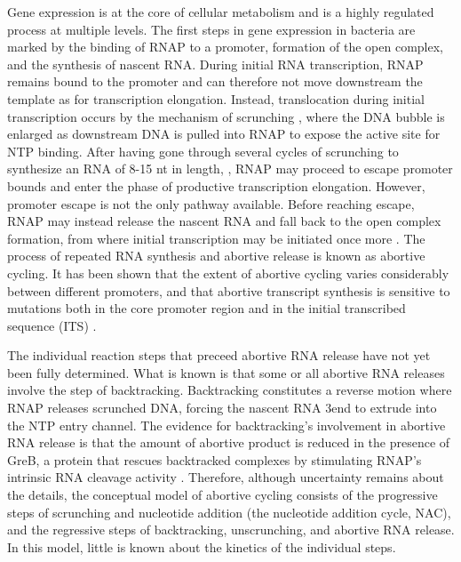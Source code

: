 %
Gene expression is at the core of cellular metabolism and is a highly regulated
process at multiple levels. The first steps in gene expression in bacteria are
marked by the binding of RNAP to a promoter, formation of the open complex,
and the synthesis of nascent RNA. During initial RNA transcription, RNAP
remains bound to the promoter and can therefore not move downstream the template as
for transcription elongation. Instead, translocation during
initial transcription occurs by the mechanism of scrunching
\cite{revyakin_abortive_2006, kapanidis_initial_2006}, where the DNA bubble is
enlarged as downstream DNA is pulled into RNAP to expose the active site for
NTP binding. After having gone through several cycles of scrunching to
synthesize an RNA of 8-15 nt in length,
\cite{carpousis_cycling_1980,hsu_vitro_2003,tang_real-time_2009,hsu_initial_2006},
RNAP may proceed to escape promoter bounds and enter the phase of productive
transcription elongation. However, promoter escape is not the only pathway
available. Before reaching escape, RNAP may instead release the
nascent RNA and fall back to the open complex formation, from where initial
transcription may be initiated once more \cite{carpousis_cycling_1980}. The
process of repeated RNA synthesis and abortive release is known as abortive
cycling. It has been shown that the extent of abortive cycling varies
considerably between different promoters, and that abortive transcript
synthesis is sensitive to mutations both in the core promoter region and in
the initial transcribed sequence (ITS) \cite{hsu_initial_2006,
hsu_promoter_2002, vo_vitro_2003}.

The individual reaction steps that preceed abortive RNA release have not yet
been fully determined. What is known is that some or all abortive RNA releases
involve the step of backtracking. Backtracking constitutes a reverse motion
where RNAP releases scrunched DNA, forcing the nascent RNA 3\ppp end to
extrude into the NTP entry channel. The evidence for backtracking's
involvement in abortive RNA release is that the amount of abortive product is
reduced in the presence of GreB, a protein that rescues backtracked complexes
by stimulating RNAP's intrinsic RNA cleavage activity
\cite{hsu_initial_2006,hsu_escherichia_1995,feng_grea-induced_1994}.
Therefore, although uncertainty remains about the details, the conceptual
model of abortive cycling consists of the progressive steps of scrunching and
nucleotide addition (the nucleotide addition cycle, NAC), and the regressive steps
of backtracking, unscrunching, and abortive RNA release. In this model, little
is known about the kinetics of the individual steps.

